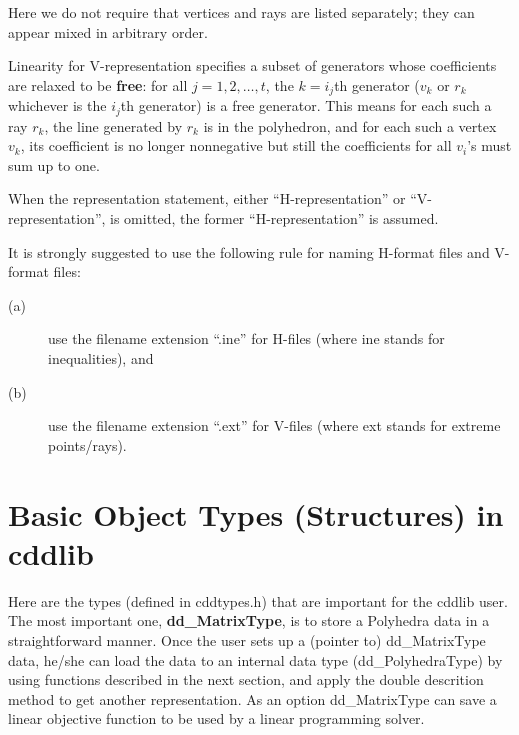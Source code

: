 \documentclass[11pt]{article}
\newcommand {\0} {{\bf 0}}
\begin{document}
\bigskip
\noindent
Here we do not require that
vertices and rays are listed
separately; they can appear mixed in arbitrary
order.

Linearity for V-representation specifies a subset of generators
whose coefficients are relaxed
to be {\bf free}:  for all $j=1,2, \ldots, t$, the $k=i_j$th generator ($v_{k}$ or $r_k$ whichever is the $i_j$th generator) is a free generator. 
This means for each such a ray $r_k$, 
the line generated by $r_k$ is in the polyhedron,
and for each such a vertex $v_k$, its coefficient is no longer nonnegative
but still the coefficients for all $v_i$'s must sum up to one. 

When the representation statement, either ``H-representation''
or ``V-representation'', is omitted, the former
``H-representation'' is assumed.

It is strongly suggested to use the following rule for naming
H-format files and V-format files:   
\begin{description}
\item[(a)] use the filename  extension ``.ine'' for H-files (where ine stands for inequalities), and 
\item[(b)]  use the filename  extension ``.ext'' for V-files (where ext stands for extreme points/rays). 
\end{description}


\section{Basic Object Types (Structures) in cddlib}  \label{DATASTR}

Here are the types (defined in cddtypes.h) that are 
important for the cddlib user.  The most important one, 
{\bf dd\_MatrixType\/},
is to store a Polyhedra data in a straightforward manner.
Once the user sets up a (pointer to) dd\_MatrixType data,
he/she can load the data to an internal data type (dd\_PolyhedraType)
by using functions described in the next section, and apply
the double descrition method to get another representation.
As an option dd\_MatrixType can save a linear objective function
to be used by a linear programming solver.
\end{document}
